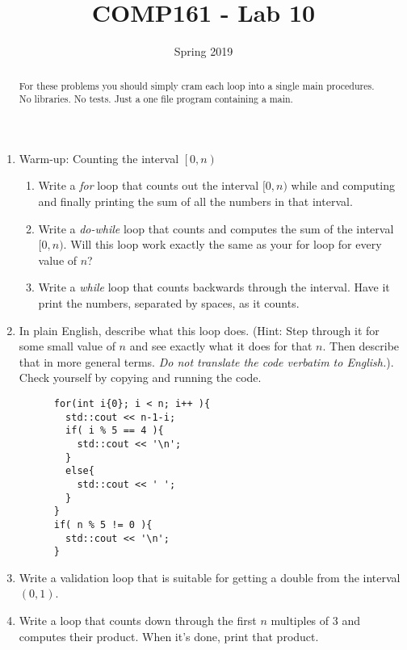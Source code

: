\documentclass[10pt]{article}
\title{COMP161 - Lab 10}
\author{ }
\date{Spring 2019}
\begin{document}
\maketitle
\thispagestyle{empty}

\begin{abstract}
For these problems you should simply cram each loop into a single main procedures. No libraries.
No tests. Just a one file program containing a main.
\end{abstract}

\begin{enumerate}
  \item Warm-up: Counting the interval $\left[{0,n}\right)$
      \begin{enumerate}
        \item Write a \textit{for} loop that counts out the interval $[0,n)$ while and computing and finally printing the sum of all the numbers in that interval.
        \item Write a \textit{do-while} loop that counts and computes the sum of the interval $[0,n)$.  Will this loop work exactly the same as your for loop for every value of $n$?
        \item Write a \textit{while} loop that counts backwards through the interval. Have it print the numbers, separated by spaces, as it counts.
      \end{enumerate}
    
  \item In plain English, describe what this loop does. (Hint: Step through it for some small value of $n$ and see exactly what it does for that $n$. Then describe that in more general terms. \textit{Do not translate the code verbatim to English.}). Check yourself by copying and running the code.

    \begin{lstlisting}
      for(int i{0}; i < n; i++ ){
        std::cout << n-1-i;
        if( i % 5 == 4 ){
          std::cout << '\n';
        }
        else{
          std::cout << ' ';
        }
      }
      if( n % 5 != 0 ){
        std::cout << '\n';
      }
    \end{lstlisting}

\item Write a validation loop that is suitable for getting a double from the interval $(0,1)$.

\item Write a loop that counts down through the first $n$ multiples of $3$ and computes their product. When it's done, print that product.


\end{enumerate}
\end{document}
